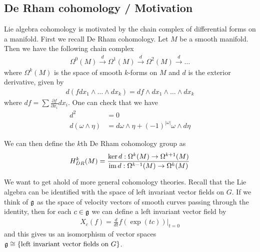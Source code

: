\documentclass[12pt]{article}
\begin{document}
\subsection{De Rham cohomology / Motivation}
Lie algebra cohomology is motivated by the chain complex of differential forms on a manifold.
First we recall De Rham cohomology. Let $M$ be a smooth manifold. Then we have the following chain complex \begin{align*}
    \Omega^0(M) \xrightarrow{d} \Omega^1(M) \xrightarrow{d} \Omega^2(M) \xrightarrow{d} \dots
\end{align*} where $\Omega^k(M)$ is the space of smooth $k$-forms on $M$ and $d$ is the exterior derivative, given by \begin{align*}
    d(f dx_1\wedge\dots\wedge dx_k) = df\wedge dx_1\wedge\dots\wedge dx_k
\end{align*} where $df = \sum \frac{\partial f}{\partial x_i}dx_i$. One can check that we have \begin{align*}
    d^2 &= 0 \\
    d(\omega\wedge\eta) &= d\omega\wedge\eta + (-1)^|\omega| \omega\wedge d\eta
\end{align*}

We can then define the $k$th De Rham cohomology group as \begin{align*}
    H^k_{DR}(M) = \frac{\ker d:\Omega^k(M)\to \Omega^{k+1}(M)}{\operatorname{im} d:\Omega^{k-1}(M)\to \Omega^k(M)}
\end{align*} 

We want to get ahold of more general cohomology theories. Recall that the Lie algebra can be identified
with the space of left invariant vector fields on $G$. If we think of $\mathfrak{g}$ as the space of velocity vectors
of smooth curves passing through the identity, then for each $c\in\mathfrak{g}$ we can define a left invariant vector field
by \begin{align*}
    X_c(f) = \frac{d}{dt}f(\exp(tc))\vert_{t=0}
\end{align*} and this gives us an isomorphism of vector spaces $\mathfrak{g}\cong \{\text{left invariant vector fields on }G\}$.

\hfill
\end{document}
